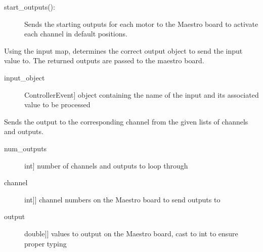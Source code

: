 \documentclass[letterpaper,10pt,english]{sphinxmanual}
\begin{document}
\begin{fulllineitems}
\begin{description}
\item[{start\_outputs():}] \leavevmode
\sphinxAtStartPar
Sends the starting outputs for each motor to the Maestro board to activate each channel in default positions.

\end{description}

\begin{fulllineitems}
\label{\detokenize{mapping:MovementMap.MovementMap.process_input}}
\sphinxAtStartPar
Using the input map, determines the correct output object to send the input value to. The returned outputs are passed to the maestro board.
\begin{description}
\item[{input\_object}] \leavevmode{[}ControllerEvent{]}
\sphinxAtStartPar
object containing the name of the input and its associated value to be processed

\end{description}

\end{fulllineitems}


\begin{fulllineitems}
\label{\detokenize{mapping:MovementMap.MovementMap.send_outputs}}
\sphinxAtStartPar
Sends the output to the corresponding channel from the given lists of channels and outputs.
\begin{description}
\item[{num\_outputs}] \leavevmode{[}int{]}
\sphinxAtStartPar
number of channels and outputs to loop through

\item[{channel}] \leavevmode{[}{[}int{]}{]}
\sphinxAtStartPar
channel numbers on the Maestro board to send outputs to

\item[{output}] \leavevmode{[}{[}double{]}{]}
\sphinxAtStartPar
values to output on the Maestro board, cast to int to ensure proper typing


\end{description}
\end{fulllineitems}
\end{fulllineitems}
\end{document}
